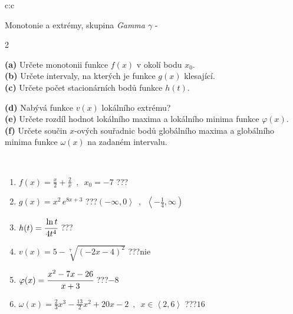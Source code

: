 \documentclass[10pt]{report}
\begin{document}
\newpage
\thispagestyle{empty}
\begin{tabular}{c:c}
\begin{minipage}[c][104.5mm][t]{0.5\linewidth}
\begin{center}
\vspace{7mm}
{\huge Monotonie a extrémy, skupina \textit{Gamma $\gamma$} -}\\[5mm]
\begin{minipage}{0.95\linewidth}
\begin{center}
{\small \begin{multicols}{2} \raggedright
\textbf{(a)} Určete monotonii funkce \(f(x)\) v okolí bodu \(x_0\). \\[1mm]
\textbf{(b)} Určete intervaly, na kterých je funkce \(g(x)\) klesající. \\[1mm]
\textbf{(c)} Určete počet stacionárních bodů funkce \(h(t)\). \par \columnbreak
\textbf{(d)} Nabývá funkce \(v(x)\) lokálního extrému? \\[1mm]
\textbf{(e)} Určete rozdíl hodnot lokálního maxima a lokálního minima funkce \(\varphi(x)\). \\[1mm]
\textbf{(f)} Určete součin \(x\)-ových souřadnic bodů globálního maxima a globálního minima funkce \(\omega(x)\) na zadaném intervalu. \\[1mm]
\end{multicols}
}
\end{center}
\end{minipage}
\\[4mm]
\begin{minipage}{0.79\linewidth}
\begin{center}
\begin{varwidth}{\linewidth}
\begin{enumerate}
\normalsize
\item $f(x)=\frac{x}{2}+\frac{2}{x} \enspace , \enspace x_0=-7$\quad \dotfill\; ???\;\dotfill \quad {}
\item $g(x)=x^2\, e^{8x+3}$\quad \dotfill\; ???\;\dotfill \quad $\left(-\infty , 0\right\rangle\enspace , \enspace \left\langle-\frac{1}{4} , \infty\right)$
\item $h(t)=\cfrac{\ln t}{4t^4}$\quad \dotfill\; ???\;\dotfill {}
\item $v(x)=5-\sqrt[7]{(-2x-4)^2}$\quad \dotfill\; ???\;\dotfill \quad $\text{nie}$
\item $\varphi(x)=\cfrac{x^2-7x-26}{x+3}$\quad \dotfill\; ???\;\dotfill \quad $-8$
\item $\omega(x)=\frac{2}{3}x^3-\frac{13}{2}x^2+20x-2 \enspace , \enspace x\in\left\langle2 , 6\right\rangle$\quad \dotfill\; ???\;\dotfill \quad $16$

\end{enumerate}
\end{varwidth}
\end{center}
\end{minipage}
\end{center}
\end{minipage}
\end{tabular}
\end{document}
